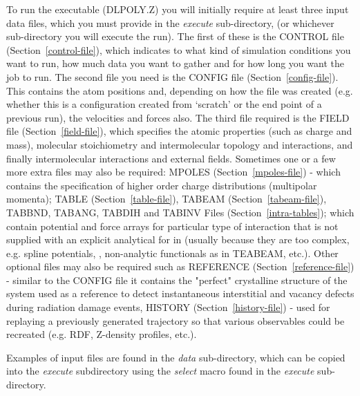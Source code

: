 To run the \D executable (DLPOLY.Z) you will initially require
at least three input data files, which you must provide in the
{\em execute} sub-directory, (or whichever sub-directory you will
execute the run).  The first of these is the CONTROL file
(Section~\ref{control-file}), which indicates to \D what kind of
simulation conditions you want to run, how much data you want to
gather and for how long you want the job to run.  The second file
you need is the CONFIG file (Section~\ref{config-file}).  This
contains the atom positions and, depending on how the file was
created (e.g. whether this is a configuration created from `scratch'
or the end point of a previous run), the velocities and forces also.
The third file required is the FIELD file (Section~\ref{field-file}),
which specifies the atomic properties (such as charge and mass),
molecular stoichiometry and intermolecular topology and interactions,
and finally intermolecular interactions and external fields.
Sometimes one or a few more extra files may also be required: MPOLES
(Section~\ref{mpoles-file}) - which contains the specification of
higher order charge distributions (multipolar momenta); TABLE
(Section~\ref{table-file}), TABEAM (Section~\ref{tabeam-file}),
TABBND, TABANG, TABDIH and TABINV Files (Section~\ref{intra-tables});
which contain potential and force arrays for particular type of
interaction that is not supplied with an explicit analytical for in
\D (usually because they are too complex, e.g. spline potentials,
, non-analytic functionals as in TEABEAM, etc.).  Other optional
files may also be required such as REFERENCE (Section~\ref{reference-file})
- similar to the CONFIG file it contains the "perfect" crystalline
structure of the system used as a reference to detect instantaneous
interstitial and vacancy defects during radiation damage events,
HISTORY (Section~\ref{history-file}) - used for replaying a previously
generated trajectory so that various observables could be recreated
(e.g. RDF, Z-density profiles, etc.).

Examples of input files are found in the {\em data} sub-directory,
which can be copied into the {\em execute} subdirectory using the {\sl
select} macro found in the {\em execute} sub-directory.

